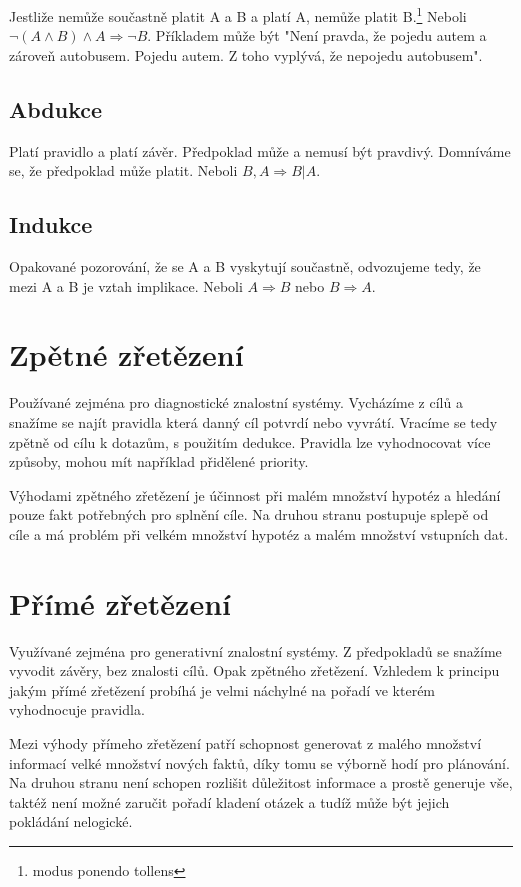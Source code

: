 \documentclass{article}
\begin{document}
Jestliže nemůže součastně platit A a B a platí A, nemůže platit B.\footnote{modus ponendo tollens} Neboli $\neg (A \wedge B) \wedge A \Rightarrow \neg B$. Příkladem může být "Není pravda, že pojedu autem a zároveň autobusem. Pojedu autem. Z toho vyplývá, že nepojedu autobusem".

\subsection*{Abdukce}

Platí pravidlo a platí závěr. Předpoklad může a nemusí být pravdivý. Domníváme se, že předpoklad může platit. Neboli $B, A \Rightarrow B | A$.

\subsection*{Indukce}

Opakované pozorování, že se A a B vyskytují součastně, odvozujeme tedy, že mezi A a B je vztah implikace. Neboli $A \Rightarrow B$ nebo $B \Rightarrow A$.

\section*{Zpětné zřetězení}

Používané zejména pro diagnostické znalostní systémy. Vycházíme z cílů a snažíme se najít pravidla která danný cíl potvrdí nebo vyvrátí. Vracíme se tedy zpětně od cílu k dotazům, s použitím dedukce. Pravidla lze vyhodnocovat více způsoby, mohou mít například přidělené priority.\par

Výhodami zpětného zřetězení je účinnost při malém množství hypotéz a hledání pouze fakt potřebných pro splnění cíle. Na druhou stranu postupuje splepě od cíle a má problém při velkém množství hypotéz a malém množství vstupních dat.

\section*{Přímé zřetězení}

Využívané zejména pro generativní znalostní systémy. Z předpokladů se snažíme vyvodit závěry, bez znalosti cílů. Opak zpětného zřetězení. Vzhledem k principu jakým přímé zřetězení probíhá je velmi náchylné na pořadí ve kterém vyhodnocuje pravidla.\par

Mezi výhody přímeho zřetězení patří schopnost generovat z malého množství informací velké množství nových faktů, díky tomu se výborně hodí pro plánování. Na druhou stranu není schopen rozlišit důležitost informace a prostě generuje vše, taktéž není možné zaručit pořadí kladení otázek a tudíž může být jejich pokládání nelogické.
\end{document}
